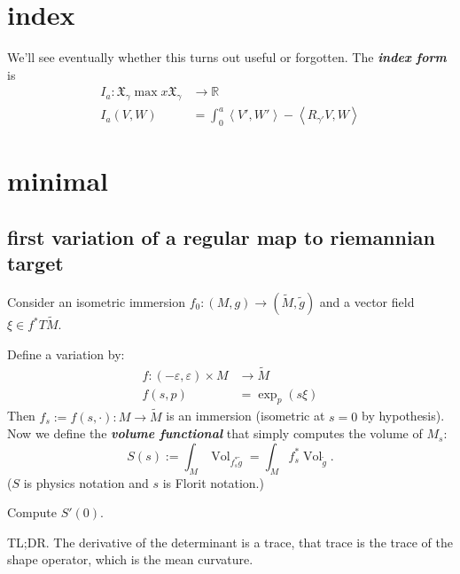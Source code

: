 \section*{index}

We'll see eventually whether this turns out useful or forgotten. The \textit{\textbf{index form}} is
 \begin{align*}
	I_a: \mathfrak{X}_\gamma\operatorname{max}x \mathfrak{X}_\gamma &\longrightarrow \mathbb{R} \\
	I_a(V,W) &=\int_0^a \left<V',W'\right>-\left<R_{\gamma'}V,W\right>
\end{align*}

\section{minimal}
\subsection{first variation of a regular map to riemannian target}

Consider an isometric immersion \(f_0:(M,g) \to(\tilde{M},\tilde{g})\) and a vector field \(\xi \in f^*T\tilde{M}\).

Define a variation by:
\begin{align*}
	f: (-\varepsilon,\varepsilon)\times M &\longrightarrow \tilde{M} \\
	f(s,p) &=\operatorname{exp}_{p}(s \xi)
\end{align*}
Then \(f_s:=f(s,\cdot):M \longrightarrow \tilde{M}\) is an immersion (isometric at \(s=0\) by hypothesis). Now we define the \textit{\textbf{volume functional}} that simply computes the volume of \(M_s\):
\[S(s):= \int_{M}\operatorname{Vol}_{f_s ^*\tilde{g}}=\int_M f_s^*\operatorname{Vol}_{\tilde{g}}.\]
(\(S\) is physics notation and \(s\) is Florit notation.)

\begin{exercise}\leavevmode
Compute \(S'(0)\).
\end{exercise}
TL;DR. The derivative of the determinant is a trace, that trace is the trace of the shape operator, which is the mean curvature.

